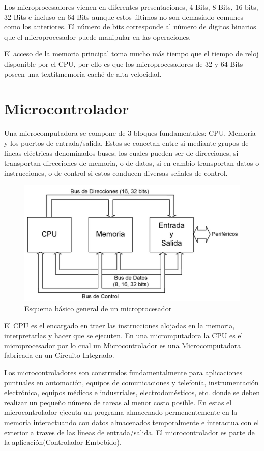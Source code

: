\documentclass[letterpaper,12pt,oneside]{book}
\begin{document}
		Los microprocesadores vienen en diferentes presentaciones, 4-Bits, 8-Bits, 16-bits, 32-Bits e incluso en 64-Bits aunque estos últimos no son demasiado comunes como los anteriores. El número de bits corresponde al número de digitos binarios que el microprocesador puede manipular en las operaciones.

		El acceso de la memoria principal toma mucho más tiempo que el tiempo de reloj disponible por el CPU, por ello es que los microprocesadores de 32 y 64 Bits poseen una textit{memoria caché} de alta velocidad.

		\section{Microcontrolador}
		Una microcomputadora se compone de 3 bloques fundamentales: CPU, Memoria y los puertos de entrada/salida. Estos se conectan entre si mediante grupos de lineas eléctricas denominados buses; los cuales pueden ser de direcciones, si transportan direcciones de memoria, o de datos, si en cambio transportan datos o instrucciones, o de control si estos conducen diversas señales de control.

		\begin{figure}[!htpb]
			\centering
			\includegraphics[scale = 1.0]{Material de Consulta/EsqMicro.PNG}
			\caption[Esquema básico general de un microprocesador]{Esquema básico general de un microprocesador}
			\label{EsqMicro}
		\end{figure}

		El CPU es el encargado en traer las instrucciones alojadas en la memoria, interpretarlas y hacer que se ejecuten. En una micromputadora la CPU es el microprocesador por lo cual un Microcontrolador es una Microcomputadora fabricada en un Circuito Integrado.

		Los microcontroladores son construidos fundamentalmente para aplicaciones puntuales en automoción, equipos de comunicaciones y telefonía, instrumentación electrónica, equipos médicos e industriales, electrodomésticos, etc. donde se deben realizar un pequeño número de tareas al menor costo posible. En estas el microcontrolador ejecuta un programa almacenado permenentemente en la memoria interactuando con datos almacenados temporalmente e interactua con el exterior a traves de las líneas de entrada/salida. El microcontrolador es parte de la aplicación(Controlador Embebido).
\end{document}
